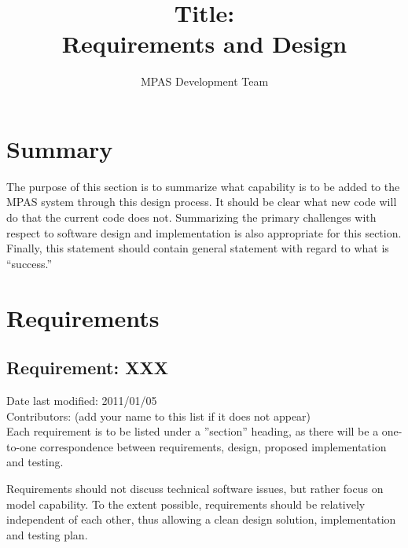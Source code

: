 \documentclass[11pt]{report}
\begin{document}
\title{Title: \\
Requirements and Design}
\author{MPAS Development Team}

\maketitle
\tableofcontents


\chapter{Summary}

The purpose of this section is to summarize what capability is to be added to the MPAS system through this design process. It should be clear what new code will do that the current code does not. Summarizing the primary challenges with respect to software design and implementation is also appropriate for this section. Finally, this statement should contain general statement with regard to what is ``success.''






\chapter{Requirements}

\section{Requirement: XXX}
Date last modified: 2011/01/05 \\
Contributors: (add your name to this list if it does not appear) \\

Each requirement is to be listed under a ''section'' heading, as there will be a one-to-one correspondence between requirements, design, proposed implementation and testing.

Requirements should not discuss technical software issues, but rather focus on model capability. To the extent possible, requirements should be relatively independent of each other, thus allowing a clean design solution, implementation and testing plan.
\end{document}
